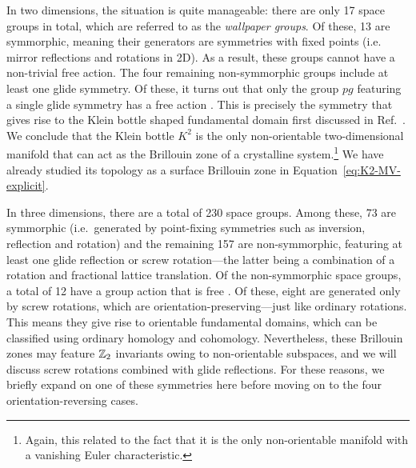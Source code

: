 In two dimensions, the situation is quite manageable: there are only 17 space groups in total, which are referred to as the \emph{wallpaper groups}. Of these, 13 are symmorphic, meaning their generators are symmetries with fixed points (i.e. mirror reflections and rotations in 2D). As a result, these groups cannot have a non-trivial free action. The four remaining non-symmorphic groups include at least one glide symmetry. Of these, it turns out that only the group $pg$ featuring a single glide symmetry has a free action \cite{Michel_crystal-symmetry}. This is precisely the symmetry that gives rise to the Klein bottle shaped fundamental domain first discussed in Ref.~\cite{CYZ_Klein-gauge}. We conclude that the Klein bottle $K^2$ is the only non-orientable two-dimensional manifold that can act as the Brillouin zone of a crystalline system.\footnote{
	Again, this related to the fact that it is the only non-orientable manifold with a vanishing Euler characteristic.}
We have already studied its topology as a surface Brillouin zone in Equation~\eqref{eq:K2-MV-explicit}.

In three dimensions, there are a total of 230 space groups. Among these, 73 are symmorphic (i.e.\ generated by point-fixing symmetries such as inversion, reflection and rotation) and the remaining 157 are non-symmorphic, featuring at least one glide reflection or screw rotation---the latter being a combination of a rotation and fractional lattice translation. Of the non-symmorphic space groups, a total of 12 have a group action that is free \parencite[Eq. (110)]{Michel_crystal-symmetry}. Of these, eight are generated only by screw rotations, which are orientation-preserving---just like ordinary rotations. This means they give rise to orientable fundamental domains, which can be classified using ordinary homology and cohomology. Nevertheless, these Brillouin zones may feature $\mathbb{Z}_2$ invariants owing to non-orientable subspaces, and we will discuss screw rotations combined with glide reflections. For these reasons, we briefly expand on one of these symmetries here before moving on to the four orientation-reversing cases.

